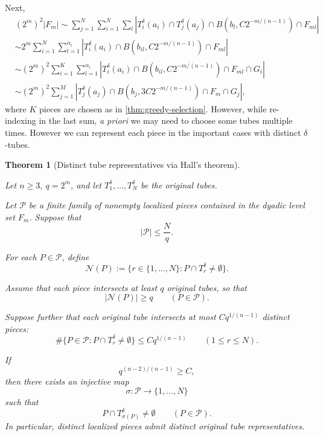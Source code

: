 \documentclass[11pt, letterpaper]{nyjm}
\newtheorem{theorem}{Theorem}[section]
\begin{document}
	Next,
	\begin{equation} \label{eq:final3}
		\begin{aligned}	
			&(2^m)^2|F_m| \sim \sum_{j=1}^{N}\sum_{i=1}^{N}\sum_{l}|T^\delta_i(a_i) \cap T^\delta_j(a_j)\cap B(b_{l},C2^{-m/(n-1)}) \cap F_{ml}| \\ 
			&\sim 2^m\sum_{i=1}^{N}\sum_{l=1}^{\alpha_i}|T^\delta_i(a_i) \cap B(b_{il},C2^{-m/(n-1)}) \cap F_{ml}| \\
			&\sim (2^m)^2\sum_{i=1}^{K}\sum_{l=1}^{\alpha_i}|T^\delta_i(a_i) \cap B(b_{il},C2^{-m/(n-1)}) \cap F_{ml} \cap G_i| \\
			&\sim  (2^{m})^2\sum_{j=1}^{M}|T^\delta_j(a_j) \cap B(b_{j},3C2^{-m/(n-1)}) \cap F_m \cap G_j|,		
		\end{aligned}
	\end{equation}
	where $K$ pieces are chosen as in \ref{thm:greedy-selection}. However, while  re-indexing in the last sum, \emph{a priori} we may need to choose some tubes multiple times.
	However we can represent each piece in the important cases with distinct $\delta$-tubes. 
	\begin{theorem}[Distinct tube representatives via Hall's theorem]
		\label{thm:hall-representatives}
		
		Let $n\ge 3$, $q=2^m$, and let
		$T_1^\delta,\ldots,T_N^\delta$ be the original tubes.
		
		Let $\mathcal P$ be a finite family of nonempty
		localized pieces contained in the dyadic level set $F_m$.
		Suppose that
		\[
		|\mathcal P|\le \frac{N}{q}.
		\]
		
		For each $P\in\mathcal P$, define
		\[
		\mathcal N(P)
		:=
		\{r\in\{1,\ldots,N\}:
		P\cap T_r^\delta\neq\emptyset\}.
		\]
		
		Assume that each piece intersects at least $q$ original
		tubes, so that
		\[
		|\mathcal N(P)|\ge q
		\qquad(P\in\mathcal P).
		\]
		
		Suppose further that each original tube intersects
		at most $Cq^{1/(n-1)}$ distinct pieces:
		\[
		\#\{P\in\mathcal P:
		P\cap T_r^\delta\neq\emptyset\}
		\le Cq^{1/(n-1)}
		\qquad(1\le r\le N).
		\]
		
		If
		\[
		q^{(n-2)/(n-1)}\ge C,
		\]
		then there exists an injective map
		\[
		\sigma:\mathcal P\longrightarrow\{1,\ldots,N\}
		\]
		such that
		\[
		P\cap T_{\sigma(P)}^\delta\neq\emptyset
		\qquad(P\in\mathcal P).
		\]
		In particular, distinct localized pieces admit
		distinct original tube representatives.
	\end{theorem}
	
\end{document}
